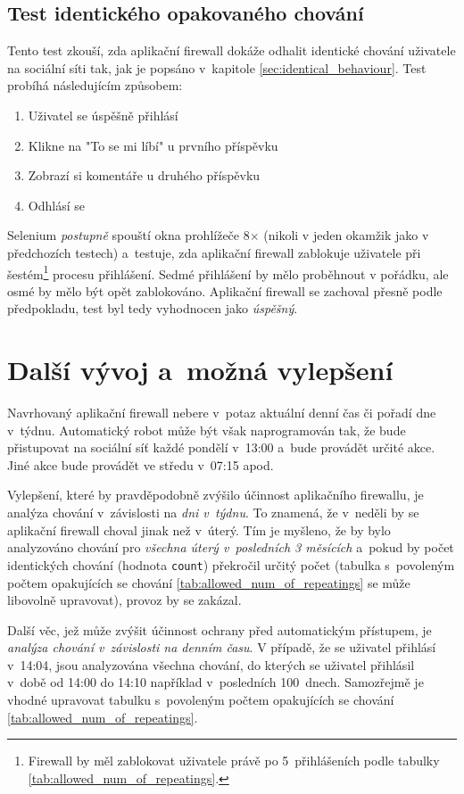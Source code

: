 \subsection*{Test identického opakovaného chování}
Tento test zkouší, zda aplikační firewall dokáže odhalit identické chování uživatele na sociální síti tak, jak je popsáno v~kapitole \ref{sec:identical_behaviour}. Test probíhá následujícím způsobem:

\begin{enumerate}
  \item Uživatel se úspěšně přihlásí
  \item Klikne na "To se mi líbí" u prvního příspěvku
  \item Zobrazí si komentáře u druhého příspěvku
  \item Odhlásí se
\end{enumerate}

\noindent
Selenium \textit{postupně} spouští okna prohlížeče 8$\times$ (nikoli v jeden okamžik jako v předchozích testech) a~testuje, zda aplikační firewall zablokuje uživatele při šestém\footnote{Firewall by měl zablokovat uživatele právě po 5~přihlášeních podle tabulky \ref{tab:allowed_num_of_repeatings}.} procesu přihlášení. Sedmé přihlášení by mělo proběhnout v pořádku, ale osmé by mělo být opět zablokováno. Aplikační firewall se zachoval přesně podle předpokladu, test byl tedy vyhodnocen jako \textit{úspěšný}.

\section{Další vývoj a~možná vylepšení}
Navrhovaný aplikační firewall nebere v~potaz aktuální denní čas či pořadí dne v~týdnu. Automatický robot může být však naprogramován tak, že bude přistupovat na sociální síť každé pondělí v~13:00 a~bude provádět určité akce. Jiné akce bude provádět ve středu v~07:15 apod.

Vylepšení, které by pravděpodobně zvýšilo účinnost aplikačního firewallu, je analýza chování v~závislosti na \textit{dni v~týdnu}. To znamená, že v~neděli by se aplikační firewall choval jinak než v~úterý. Tím je myšleno, že by bylo analyzováno chování pro \textit{všechna úterý v~posledních 3 měsících} a~pokud by počet identických chování (hodnota \texttt{count}) překročil určitý počet (tabulka s~povoleným počtem opakujících se chování \ref{tab:allowed_num_of_repeatings} se může libovolně upravovat), provoz by se zakázal. 

Další věc, jež může zvýšit účinnost ochrany před automatickým přístupem, je \textit{analýza chování v~závislosti na denním času}. V případě, že se uživatel přihlásí v~14:04, jsou analyzována všechna chování, do kterých se uživatel přihlásil v~době od 14:00 do 14:10 například v~posledních 100~dnech. Samozřejmě je vhodné upravovat tabulku s~povoleným počtem opakujících se chování \ref{tab:allowed_num_of_repeatings}. 

